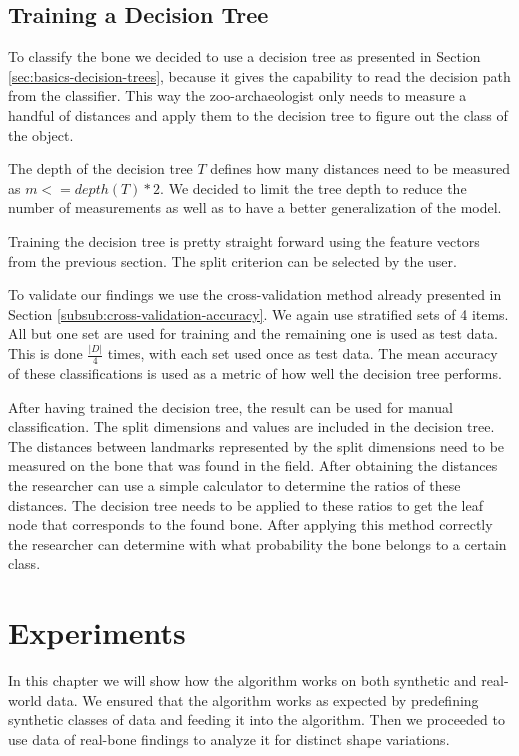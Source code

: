 \documentclass[pdftex,12pt,a4paper]{report}
\begin{document}
\section{Training a Decision Tree}

To classify the bone we decided to use a decision tree as presented in Section \ref{sec:basics-decision-trees}, because it gives the capability to read the decision path from the classifier. This way the zoo-archaeologist only needs to measure a handful of distances and apply them to the decision tree to figure out the class of the object.

The depth of the decision tree $T$ defines how many distances need to be measured as $m <= depth(T) * 2$. We decided to limit the tree depth to reduce the number of measurements as well as to have a better generalization of the model.

Training the decision tree is pretty straight forward using the feature vectors from the previous section. The split criterion can be selected by the user.

To validate our findings we use the cross-validation method already presented in Section \ref{subsub:cross-validation-accuracy}. We again use stratified sets of 4 items. All but one set are used for training and the remaining one is used as test data. This is done $\frac{|D|}{4}$ times, with each set used once as test data. The mean accuracy of these classifications is used as a metric of how well the decision tree performs.

After having trained the decision tree, the result can be used for manual classification. The split dimensions and values are included in the decision tree. The distances between landmarks represented by the split dimensions need to be measured on the bone that was found in the field. After obtaining the distances the researcher can use a simple calculator to determine the ratios of these distances. The decision tree needs to be applied to these ratios to get the leaf node that corresponds to the found bone. After applying this method correctly the researcher can determine with what probability the bone belongs to a certain class.

\chapter{Experiments}
\label{chapter:experiments}

In this chapter we will show how the algorithm works on both synthetic and real-world data. We ensured that the algorithm works as expected by predefining synthetic classes of data and feeding it into the algorithm. Then we proceeded to use data of real-bone findings to analyze it for distinct shape variations. 
\end{document}
